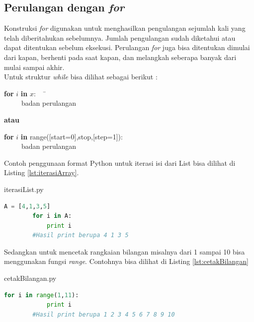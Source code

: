 
\subsection{Perulangan dengan \textit{for}}
Konstruksi \textit{for} digunakan untuk menghasilkan pengulangan sejumlah kali yang telah diberitahukan sebelumnya. Jumlah pengulangan sudah diketahui atau dapat ditentukan sebelum eksekusi. Perulangan \textit{for} juga bisa ditentukan dimulai dari kapan, berhenti pada saat kapan, dan melangkah seberapa banyak dari mulai sampai akhir. \\

Untuk struktur \textit{while} bisa dilihat sebagai berikut : 
\begin{tabbing}

\textbf{for} $i$ \textbf{in} $x$:~~\=\ \\
~~~~~badan perulangan\\
\end{tabbing}
\textbf{atau}
\begin{tabbing}
\textbf{for} $i$ \textbf{in} range([start=0],stop,[step=1]):\\
~~~~~badan perulangan\\
\end{tabbing}


Contoh penggunaan format Python untuk iterasi isi dari List bisa dilihat di Listing \ref{lst:iterasiArray}.
\begin{listprog}{iterasiList.py}
	\label{lst:iterasiArray}
	\begin{lstlisting}[language=Python]
		A = [4,1,3,5]
		for i in A:
			print i
		#Hasil print berupa 4 1 3 5
	\end{lstlisting}
\end{listprog}

Sedangkan untuk mencetak rangkaian bilangan misalnya dari 1 sampai 10 bisa menggunakan fungsi \textit{range}. Contohnya bisa dilihat di Listing \ref{lst:cetakBilangan}
\begin{listprog}{cetakBilangan.py}
	\label{lst:cetakBilangan}
	\begin{lstlisting}[language=Python]
		for i in range(1,11):
			print i
		#Hasil print berupa 1 2 3 4 5 6 7 8 9 10
	\end{lstlisting}
\end{listprog}

